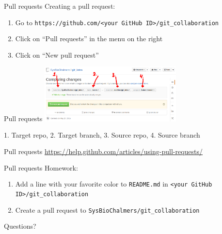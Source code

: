 \documentclass{beamer}
\newcommand{\fmtcmd}[1]{\texttt{#1}}
\begin{document}
\begin{frame}{Pull requests}
  Creating a pull request:

  \begin{enumerate}
    \item Go to \fmtcmd{https://github.com/<your GitHub ID>/git_collaboration}
    \item Click on ``Pull requests'' in the menu on the right
    \item Click on ``New pull request''
  \end{enumerate}
\end{frame}

\begin{frame}{Pull requests}
  \center
  \includegraphics[height=3cm]{comparing_changes.png}

  1. Target repo, 2. Target branch, 3. Source repo, 4. Source branch
\end{frame}

\begin{frame}{Pull requests}
  \center
  \Large \url{https://help.github.com/articles/using-pull-requests/}
\end{frame}

\begin{frame}{Pull requests}
  Homework:

  \begin{enumerate}
    \item Add a line with your favorite color to \fmtcmd{README.md} in
      \fmtcmd{<your GitHub ID>/git_collaboration}
    \item Create a pull request to \fmtcmd{SysBioChalmers/git_collaboration}
  \end{enumerate}
\end{frame}

\begin{frame}{}
  \center
  \Huge Questions?
\end{frame}
\end{document}
